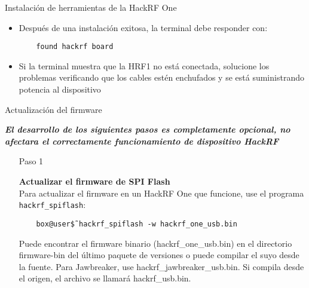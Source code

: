 \begin{frame}{Instalación de  herramientas de la HackRF One}

\begin{itemize}
    \item
    Después de una instalación exitosa, la terminal debe responder con: 

    \begin{block}{}
    \texttt{ ~~~found hackrf board}
    \end{block}
    \item
    {Si la terminal muestra que la HRF1 no está conectada, solucione los problemas verificando que los cables estén enchufados y se está suministrando potencia al dispositivo}
    
\end{itemize}
\end{frame}

\begin{frame}{Actualización del firmware}

\textbf \textit {El desarrollo de los siguientes pasos es completamente opcional, no afectara el correctamente funcionamiento de dispositivo HackRF}

\begin{itemize}
    \item [Paso 1]
    {\textbf {Actualizar el firmware de SPI Flash }\\ Para actualizar el firmware en un HackRF One que funcione, use el programa \texttt{hackrf\_spiflash}:
    
    \begin{block}{}
    \texttt{
    ~~~box@user\~\$ hackrf\_spiflash -w hackrf\_one\_usb.bin}
    \end{block}
    
    Puede encontrar el firmware binario (hackrf\_one\_usb.bin) en el directorio firmware-bin del último paquete de versiones o puede compilar el suyo desde la fuente. Para Jawbreaker, use hackrf\_jawbreaker\_usb.bin. Si compila desde el origen, el archivo se llamará hackrf\_usb.bin. 
    }
    
\end{itemize}
\end{frame}

